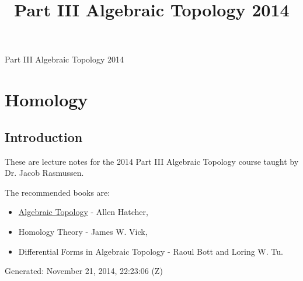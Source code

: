 \documentclass[10pt,]{book}
\title{Part III Algebraic Topology 2014}
\author{}
\date{}
\theoremstyle{plain}
\theoremstyle{definition}
\numberwithin{equation}{section}
\begin{document}
\frontmatter
\thispagestyle{empty}
\begin{center}
{\Huge Part III Algebraic Topology 2014}
\end{center}\par
{}
\clearpage
\thispagestyle{empty}
\clearpage
\maketitle
\clearpage
\thispagestyle{empty}
\clearpage
\setcounter{tocdepth}{1}
\renewcommand*\contentsname{Contents}
\tableofcontents
\mainmatter
\typeout{************************************************}
\typeout{************************************************}
\chapter[Homology]{Homology}\label{chap-homology}
\typeout{************************************************}
\typeout{************************************************}
\section[Introduction]{Introduction}\label{sec-introduction}

          These are lecture notes for the 2014 Part III Algebraic Topology course taught by Dr. Jacob Rasmussen.
\par

          The recommended books are:
          \begin{itemize}
\item{}\href{http://www.math.cornell.edu/~hatcher/AT/ATpage.html}{Algebraic Topology} - Allen Hatcher,\item{}Homology Theory - James W. Vick,\item{}Differential Forms in Algebraic Topology - Raoul Bott and Loring W. Tu.\end{itemize}

\par

          Generated: November 21, 2014, 22:23:06 (Z)
\typeout{************************************************}
\typeout{************************************************}
\end{document}
